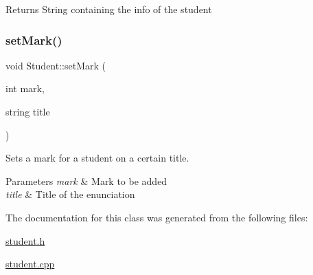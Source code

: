 \begin{DoxyReturn}{Returns}
String containing the info of the student 
\end{DoxyReturn}
\mbox{\label{class_student_ad197a15a65230e59d0a690a49738e9af}} 
\subsubsection{\texorpdfstring{set\+Mark()}{setMark()}}
{\footnotesize\ttfamily void Student\+::set\+Mark (\begin{DoxyParamCaption}\item[{int}]{mark,  }\item[{string}]{title }\end{DoxyParamCaption})}



Sets a mark for a student on a certain title. 


\begin{DoxyParams}{Parameters}
{\em mark} & Mark to be added \\
\hline
{\em title} & Title of the enunciation \\
\hline
\end{DoxyParams}


The documentation for this class was generated from the following files\+:\begin{DoxyCompactItemize}
\item 
\hyperlink{student_8h}{student.\+h}\item 
\hyperlink{student_8cpp}{student.\+cpp}\end{DoxyCompactItemize}
